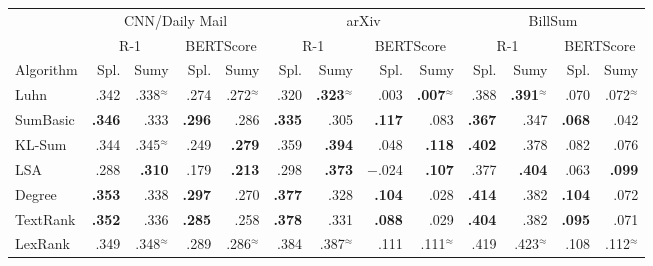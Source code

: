 
\begin{tabular}{lrrrrrrrrrrrr}
\toprule
 & \multicolumn{4}{c}{CNN/Daily Mail} & \multicolumn{4}{c}{arXiv} & \multicolumn{4}{c}{BillSum} \\
\cmidrule(lr){2-5}\cmidrule(lr){6-9}\cmidrule(lr){10-13}
 & \multicolumn{2}{c}{R-1} & \multicolumn{2}{c}{BERTScore} & \multicolumn{2}{c}{R-1} & \multicolumn{2}{c}{BERTScore} & \multicolumn{2}{c}{R-1} & \multicolumn{2}{c}{BERTScore} \\
Algorithm & Spl. & Sumy & Spl. & Sumy & Spl. & Sumy & Spl. & Sumy & Spl. & Sumy & Spl. & Sumy \\
\midrule
Luhn & .342 & .338$^{\approx}$ & .274 & .272$^{\approx}$ & .320 & \textbf{.323}$^{\approx}$ & .003 & \textbf{.007}$^{\approx}$ & .388 & \textbf{.391}$^{\approx}$ & .070 & .072$^{\approx}$ \\
SumBasic & \textbf{.346} & .333 & \textbf{.296} & .286 & \textbf{.335} & .305 & \textbf{.117} & .083 & \textbf{.367} & .347 & \textbf{.068} & .042 \\
KL-Sum & .344 & .345$^{\approx}$ & .249 & \textbf{.279} & .359 & \textbf{.394} & .048 & \textbf{.118} & \textbf{.402} & .378 & .082 & .076 \\
LSA & .288 & \textbf{.310} & .179 & \textbf{.213} & .298 & \textbf{.373} & $-$.024 & \textbf{.107} & .377 & \textbf{.404} & .063 & \textbf{.099} \\
Degree & \textbf{.353} & .338 & \textbf{.297} & .270 & \textbf{.377} & .328 & \textbf{.104} & .028 & \textbf{.414} & .382 & \textbf{.104} & .072 \\
TextRank & \textbf{.352} & .336 & \textbf{.285} & .258 & \textbf{.378} & .331 & \textbf{.088} & .029 & \textbf{.404} & .382 & \textbf{.095} & .071 \\
LexRank & .349 & .348$^{\approx}$ & .289 & .286$^{\approx}$ & .384 & .387$^{\approx}$ & .111 & .111$^{\approx}$ & .419 & .423$^{\approx}$ & .108 & .112$^{\approx}$ \\
\bottomrule
\end{tabular}


